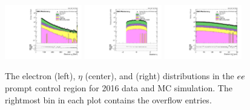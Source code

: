 \begin{figure}
\centering
\includegraphics[width=0.3\textwidth]{figures/selection/pcr_ee_2016/electronPt.pdf}
\includegraphics[width=0.3\textwidth]{figures/selection/pcr_ee_2016/electronEta.pdf}
\includegraphics[width=0.3\textwidth]{figures/selection/pcr_ee_2016/electronAbsD0_50um.pdf}
\caption{The electron \pt (left), $\eta$ (center), and \ad (right) distributions in the $ee$ prompt control region for 2016 data and MC simulation. The rightmost bin in each plot
contains the overflow entries.}
\label{pcr_ee_2016}
\end{figure}